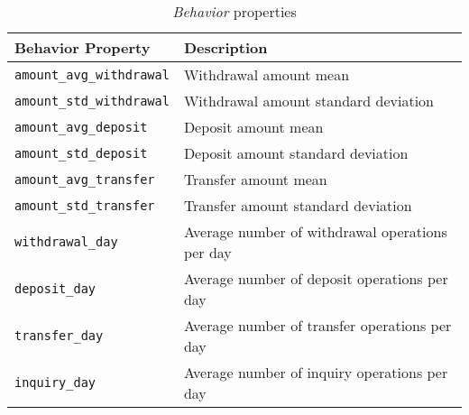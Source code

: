 \begin{table}[H]
    \centering
    \begin{tabular}{|l|l|}
        \hline
        \textbf{Behavior Property} & \textbf{Description} \\ 
        \hline
        \texttt{amount\_avg\_withdrawal} & Withdrawal amount mean\\ 
        \hline
        \texttt{amount\_std\_withdrawal} & Withdrawal amount standard deviation \\ 
        \hline
        \texttt{amount\_avg\_deposit} & Deposit amount mean \\ 
        \hline
        \texttt{amount\_std\_deposit} & Deposit amount standard deviation\\ 
        \hline
        \texttt{amount\_avg\_transfer} & Transfer amount mean \\ 
        \hline
        \texttt{amount\_std\_transfer} & Transfer amount standard deviation \\ 
        \hline
        \texttt{withdrawal\_day} & Average number of withdrawal operations per day \\ 
        \hline
        \texttt{deposit\_day} & Average number of deposit operations per day \\ 
        \hline
        \texttt{transfer\_day} & Average number of transfer operations per day \\ 
        \hline
        \texttt{inquiry\_day} & Average number of inquiry operations per day \\ 
        \hline
    \end{tabular}
    \caption{\emph{Behavior} properties}
    \label{table:behavior-properties}
\end{table}
